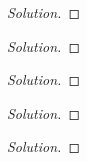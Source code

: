 \begin{problem}
\end{problem}
\begin{proof}[Solution]
\end{proof}
\begin{problem}
\end{problem}
\begin{proof}[Solution]
\end{proof}
\begin{problem}
\end{problem}
\begin{proof}[Solution]
\end{proof}
\begin{problem}
\end{problem}
\begin{proof}[Solution]
\end{proof}
\begin{problem}
\end{problem}
\begin{proof}[Solution]
\end{proof}

